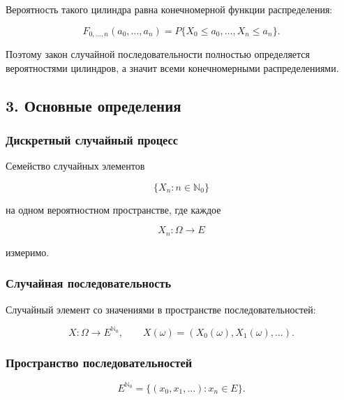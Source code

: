\documentclass[
  11pt,
  a4paper,
]{article}
\begin{document}
Вероятность такого цилиндра равна конечномерной функции распределения:

\[
F_{0,\ldots,n}(a_0,\ldots,a_n)
=
P\{X_0\le a_0,\ldots,X_n\le a_n\}.
\]

Поэтому закон случайной последовательности полностью определяется
вероятностями цилиндров, а значит всеми конечномерными распределениями.

\subsection{3. Основные
определения}\label{ux43eux441ux43dux43eux432ux43dux44bux435-ux43eux43fux440ux435ux434ux435ux43bux435ux43dux438ux44f}

\subsubsection{Дискретный случайный
процесс}\label{ux434ux438ux441ux43aux440ux435ux442ux43dux44bux439-ux441ux43bux443ux447ux430ux439ux43dux44bux439-ux43fux440ux43eux446ux435ux441ux441}

Семейство случайных элементов

\[
\{X_n:n\in\mathbb N_0\}
\]

на одном вероятностном пространстве, где каждое

\[
X_n:\Omega\to E
\]

измеримо.

\subsubsection{Случайная
последовательность}\label{ux441ux43bux443ux447ux430ux439ux43dux430ux44f-ux43fux43eux441ux43bux435ux434ux43eux432ux430ux442ux435ux43bux44cux43dux43eux441ux442ux44c}

Случайный элемент со значениями в пространстве последовательностей:

\[
X:\Omega\to E^{\mathbb N_0},
\qquad
X(\omega)=(X_0(\omega),X_1(\omega),\ldots).
\]

\subsubsection{Пространство
последовательностей}\label{ux43fux440ux43eux441ux442ux440ux430ux43dux441ux442ux432ux43e-ux43fux43eux441ux43bux435ux434ux43eux432ux430ux442ux435ux43bux44cux43dux43eux441ux442ux435ux439}

\[
E^{\mathbb N_0}
=
\{(x_0,x_1,\ldots):x_n\in E\}.
\]
\end{document}
